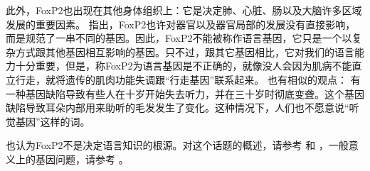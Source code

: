 %
此外，FoxP2也出现在其他身体组织上：它是决定肺、心脏、肠以及大脑许多区域发展的重要因素\citep{MF2003a}。 \citet[--261]{MF2003a}指出，FoxP2也许对器官以及器官局部的发展没有直接影响，而是规范了一串不同的基因。因此，FoxP2不能被称作语言基因，它只是一个以复杂方式跟其他基因相互影响的基因。只不过，跟其它基因相比，它对我们的语言能力十分重要，但是，称FoxP2为语言基因是不正确的，就像没人会因为肌病不能直立行走，就将遗传的肌肉功能失调跟“行走基因”联系起来\citep[]{Bishop2002a}。 \citet[]{Karmiloff-Smith98a}也有相似的观点：
  有一种基因缺陷导致有些人在十岁开始失去听力，并在三十岁时彻底变聋。这个基因缺陷导致耳朵内部用来助听的毛发发生了变化。这种情况下，人们也不愿意说“听觉基因”这样的词。

 \citet*[]{FHC2005a}也认为FoxP2不是决定语言知识的根源。对这个话题的概述，请参考 和 ，一般意义上的基因问题，请参考 。

